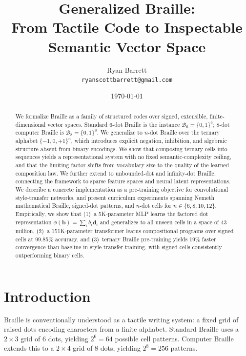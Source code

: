 \documentclass[11pt,a4paper]{article}
\title{%
  \textbf{Generalized Braille}:\\
  From Tactile Code to Inspectable\\
  Semantic Vector Space%
}
\author{
  Ryan Barrett \\
  \texttt{ryanscottbarrett@gmail.com}
}
\date{\today}
\newcommand{\B}{\mathcal{B}}
\begin{document}
\maketitle

\begin{abstract}
We formalize Braille as a family of structured codes over signed,
extensible, finite-dimensional vector spaces.
Standard 6-dot Braille is the instance $\B_6 = \{0,1\}^6$;
8-dot computer Braille is $\B_8 = \{0,1\}^8$.
We generalize to $n$-dot Braille over the ternary alphabet $\{-1,0,+1\}^n$,
which introduces explicit negation, inhibition, and algebraic structure
absent from binary encodings.
We show that composing ternary cells into sequences yields a
representational system with no fixed semantic-complexity ceiling,
and that the limiting factor shifts from vocabulary size to the
quality of the learned composition law.
We further extend to unbounded-dot and infinity-dot Braille,
connecting the framework to sparse feature spaces and
neural latent representations.
We describe a concrete implementation as a pre-training objective
for convolutional style-transfer networks, and present curriculum
experiments spanning Nemeth mathematical Braille, signed-dot patterns,
and $n$-dot cells for $n \in \{6, 8, 10, 12\}$.
Empirically, we show that (1)~a 5K-parameter MLP learns the factored
dot representation $\phi(\bm{b}) = \sum_i b_i \bm{d}_i$ and
generalizes to all unseen cells in a space of 43 million,
(2)~a 151K-parameter transformer learns compositional programs
over signed cells at 99.85\% accuracy, and
(3)~ternary Braille pre-training yields 19\% faster convergence
than baseline in style-transfer training, with signed cells
consistently outperforming binary cells.
\end{abstract}

\section{Introduction}
\label{sec:intro}

Braille is conventionally understood as a tactile writing system:
a fixed grid of raised dots encoding characters from a finite alphabet.
Standard Braille uses a $2 \times 3$ grid of 6 dots, yielding $2^6 = 64$
possible cell patterns.
Computer Braille extends this to a $2 \times 4$ grid of 8 dots,
yielding $2^8 = 256$ patterns.
\end{document}
